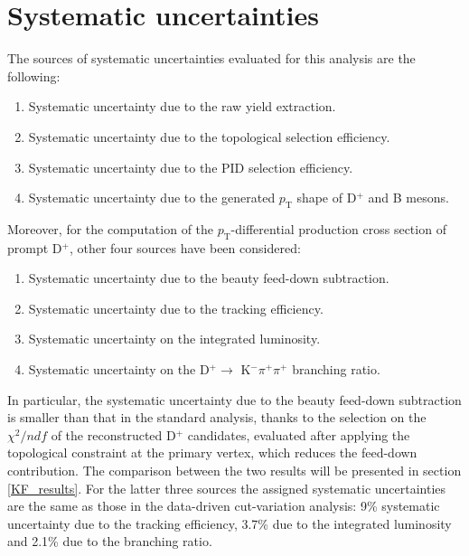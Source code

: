 \documentclass[b5paper,10pt,twoside,oldstyle,classica]{toptesi}
\newcommand{\pt}{p_\text{T}}
\begin{document}
\section{Systematic uncertainties}
\label{KF_syst_sec}
The sources of systematic uncertainties evaluated for this analysis are the following:
\begin{enumerate}
 \item Systematic uncertainty due to the raw yield extraction.
 \item Systematic uncertainty due to the topological selection efficiency.
 \item Systematic uncertainty due to the PID selection efficiency.
 \item Systematic uncertainty due to the generated $\pt$ shape of D$^+$ and B mesons.
\end{enumerate}
Moreover, for the computation of the $\pt$-differential production cross section of prompt D$^+$, other four sources have been considered:
\begin{enumerate}
 \item Systematic uncertainty due to the beauty feed-down subtraction.
 \item Systematic uncertainty due to the tracking efficiency.
 \item Systematic uncertainty on the integrated luminosity.
 \item Systematic uncertainty on the D$^+\rightarrow$ K$^-\pi^+\pi^+$ branching ratio.
 \end{enumerate}
In particular, the systematic uncertainty due to the beauty feed-down subtraction is smaller than that in the standard analysis, thanks to the selection on the $\chi^2/ndf$ of the reconstructed D$^+$ candidates, evaluated after applying the topological constraint at the primary vertex, which reduces the feed-down contribution. The comparison between the two results will be presented in section \ref{KF_results}. For the latter three sources the assigned systematic uncertainties are the same as those in the data-driven cut-variation analysis: 9\% systematic uncertainty due to the tracking efficiency, 3.7\% due to the integrated luminosity and 2.1\% due to the branching ratio. 
\end{document}
